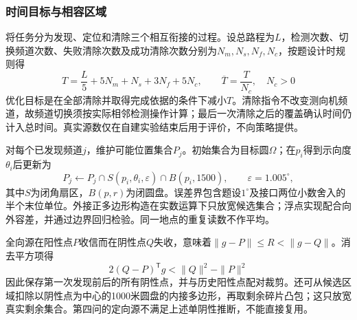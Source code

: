 \documentclass{JXUSTmodeling}
\begin{document}
\subsubsection{时间目标与相容区域}
将任务分为发现、定位和清除三个相互衔接的过程。设总路程为$L$，检测次数、切换频道次数、失败清除次数及成功清除次数分别为$N_m,N_s,N_f,N_c$，按题设计时规则得
\begin{equation}
 T=\frac{L}{5}+5N_m+N_s+3N_f+5N_c,
 \qquad \overline T=\frac{T}{N_c},\quad N_c>0
 \label{eq:search-time}
\end{equation}
优化目标是在全部清除并取得完成依据的条件下减小$T$。清除指令不改变测向机频道，故频道切换须按实际相邻检测操作计算；最后一次清除之后的覆盖确认时间仍计入总时间。真实源数仅在自建实验结束后用于评价，不向策略提供。

对每个已发现频道$j$，维护可能位置集合$P_j$。初始集合为目标圆$\Omega$；在$p_i$得到示向度$\theta_i$后更新为
\begin{equation}
 P_j\leftarrow P_j\cap S(p_i,\theta_i,\varepsilon)
          \cap B(p_i,1500),\qquad \varepsilon=1.005^\circ,
 \label{eq:search-region}
\end{equation}
其中$S$为闭角扇区，$B(p,r)$为闭圆盘。误差界包含题设$1^\circ$及接口两位小数舍入的半个末位单位。外接正多边形构造在实数运算下只放宽候选集合；浮点实现配合向外容差，并通过边界回归检验。同一地点的重复读数不作平均。

全向源在阳性点$P$收信而在阴性点$Q$失收，意味着$\|g-P\|\le R<\|g-Q\|$。消去平方项得
\begin{equation}
 2(Q-P)^{\mathsf T}g<\|Q\|^2-\|P\|^2
 \label{eq:omni-negative}
\end{equation}
因此保存第一次发现前后的所有阴性点，并与历史阳性点配对裁剪。还可从候选区域扣除以阴性点为中心的1000米圆盘的内接多边形，再取剩余碎片凸包；这只放宽真实剩余集合。第四问的定向源不满足上述单阴性推断，不能直接复用。
\end{document}
